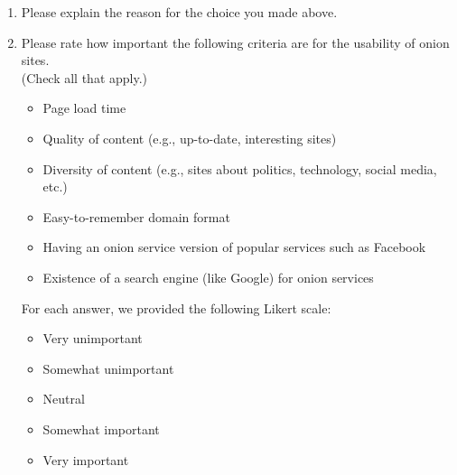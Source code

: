 \begin{enumerate}
    \item Please explain the reason for the choice you made above.

    \item Please rate how important the following criteria are for the
        usability of onion sites.\\(Check all that apply.)
        \begin{itemize}
            \item Page load time
            \item Quality of content (e.g., up-to-date, interesting sites)
            \item Diversity of content (e.g., sites about politics, technology, social media, etc.)
            \item Easy-to-remember domain format
            \item Having an onion service version of popular services such as Facebook
            \item Existence of a search engine (like Google) for onion services
        \end{itemize}
        For each answer, we provided the following Likert scale:
        \begin{itemize}
            \item Very unimportant
            \item Somewhat unimportant
            \item Neutral
            \item Somewhat important
            \item Very important
        \end{itemize}
\end{enumerate}

